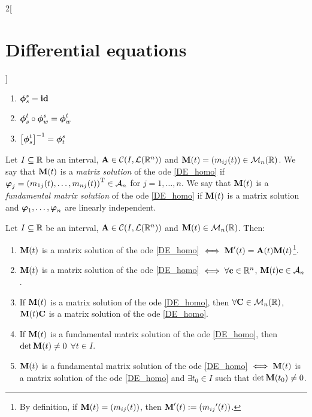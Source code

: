 \documentclass[../../../main.tex]{subfiles}
\begin{document}
\begin{multicols}{2}[\section{Differential equations}]
\begin{corollary}
    \begin{enumerate}
      \item $\boldsymbol{\mathrm{\phi}}_s^s=\boldsymbol{\mathrm{\mathrm{id}}}$
      \item $\boldsymbol{\mathrm{\phi}}_s^t\circ\boldsymbol{\mathrm{\phi}}_w^s=\boldsymbol{\mathrm{\phi}}_w^t$
      \item ${\left[\boldsymbol{\mathrm{\phi}}_s^t\right]}^{-1}=\boldsymbol{\mathrm{\phi}}_t^s$
    \end{enumerate}
  \end{corollary}
  \begin{definition}
    Let $I\subseteq \mathbb{R}$ be an interval, $\boldsymbol{\mathrm{A}}\in\mathcal{C}(I,\mathcal{L}(\mathbb{R}^n))$ and $\boldsymbol{\mathrm{M}}(t)=(m_{ij}(t))\in\mathcal{M}_n(\mathbb{R})$. We say that $\boldsymbol{\mathrm{M}}(t)$ is a \textit{matrix solution} of the ode \eqref{DE_homo} if $\boldsymbol{\mathrm{\varphi}}_j={(m_{1j}(t),\ldots,m_{nj}(t))}^\mathrm{T}\in\mathcal{A}_n$ for $j=1,\ldots,n$. We say that $\boldsymbol{\mathrm{M}}(t)$ is a \textit{fundamental matrix solution} of the ode \eqref{DE_homo} if $\boldsymbol{\mathrm{M}}(t)$ is a matrix solution and $\boldsymbol{\mathrm{\varphi}}_1,\ldots,\boldsymbol{\mathrm{\varphi}}_n$ are linearly independent.
  \end{definition}
  \begin{prop}
    Let $I\subseteq \mathbb{R}$ be an interval, $\boldsymbol{\mathrm{A}}\in\mathcal{C}(I,\mathcal{L}(\mathbb{R}^n))$ and $\boldsymbol{\mathrm{M}}(t)\in\mathcal{M}_n(\mathbb{R})$. Then:
    \begin{enumerate}
      \item $\boldsymbol{\mathrm{M}}(t)$ is a matrix solution of the ode \eqref{DE_homo} $\iff\boldsymbol{\mathrm{M}}'(t)=\boldsymbol{\mathrm{A}}(t)\boldsymbol{\mathrm{M}}(t)$\footnote{By definition, if $\boldsymbol{\mathrm{M}}(t)=(m_{ij}(t))$, then $\boldsymbol{\mathrm{M}}'(t):=({m_{ij}}'(t))$.}.
      \item $\boldsymbol{\mathrm{M}}(t)$ is a matrix solution of the ode \eqref{DE_homo} $\iff\forall \boldsymbol{\mathrm{c}}\in\mathbb{R}^n$, $\boldsymbol{\mathrm{M}}(t)\boldsymbol{\mathrm{c}}\in\mathcal{A}_n$.
      \item If $\boldsymbol{\mathrm{M}}(t)$ is a matrix solution of the ode \eqref{DE_homo}, then $\forall \boldsymbol{\mathrm{C}}\in\mathcal{M}_n(\mathbb{R})$, $\boldsymbol{\mathrm{M}}(t)\boldsymbol{\mathrm{C}}$ is a matrix solution of the ode \eqref{DE_homo}.
      \item If $\boldsymbol{\mathrm{M}}(t)$ is a fundamental matrix solution of the ode \eqref{DE_homo}, then $\det\boldsymbol{\mathrm{M}}(t)\ne 0$ $\forall t\in I$.
      \item $\boldsymbol{\mathrm{M}}(t)$ is a fundamental matrix solution of the ode \eqref{DE_homo} $\iff\boldsymbol{\mathrm{M}}(t)$ is a matrix solution of the ode \eqref{DE_homo} and $\exists t_0\in I$ such that $\det\boldsymbol{\mathrm{M}}(t_0)\ne 0$.

\end{enumerate}
\end{prop}
\end{multicols}
\end{document}
